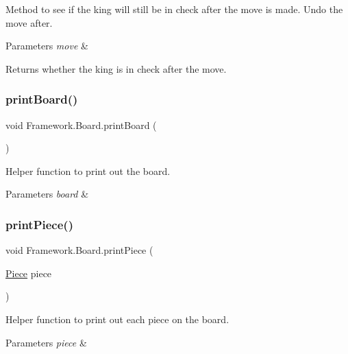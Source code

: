 Method to see if the king will still be in check after the move is made. Undo the move after. 
\begin{DoxyParams}{Parameters}
{\em move} & \\
\hline
\end{DoxyParams}
\begin{DoxyReturn}{Returns}
whether the king is in check after the move. 
\end{DoxyReturn}
\hypertarget{class_framework_1_1_board_ae18508acc0c51e9b9b1af6a3d52a6860}{}\label{class_framework_1_1_board_ae18508acc0c51e9b9b1af6a3d52a6860} 
\subsubsection{\texorpdfstring{print\+Board()}{printBoard()}}
{\footnotesize\ttfamily void Framework.\+Board.\+print\+Board (\begin{DoxyParamCaption}{ }\end{DoxyParamCaption})}

Helper function to print out the board. 
\begin{DoxyParams}{Parameters}
{\em board} & \\
\hline
\end{DoxyParams}
\hypertarget{class_framework_1_1_board_a656f19360facc6e1ebcc013fe4c59b5a}{}\label{class_framework_1_1_board_a656f19360facc6e1ebcc013fe4c59b5a} 
\subsubsection{\texorpdfstring{print\+Piece()}{printPiece()}}
{\footnotesize\ttfamily void Framework.\+Board.\+print\+Piece (\begin{DoxyParamCaption}\item[{\hyperlink{class_framework_1_1_pieces_1_1_piece}{Piece}}]{piece }\end{DoxyParamCaption})}

Helper function to print out each piece on the board. 
\begin{DoxyParams}{Parameters}
{\em piece} & \\
\hline
\end{DoxyParams}
\hypertarget{class_framework_1_1_board_aa2f8d03b279e53a5a75762667d9b9f9f}{}\label{class_framework_1_1_board_aa2f8d03b279e53a5a75762667d9b9f9f} 
